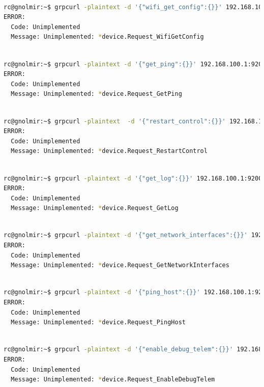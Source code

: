 \documentclass[IN,11pt,twoside,openright,bachelor,english]{tumthesis}
\begin{document}
\begin{lstlisting}[language=bash,basicstyle=\tiny]

rc@gnolmir:~$ grpcurl -plaintext -d '{"wifi_get_config":{}}' 192.168.100.1:9200 SpaceX.API.Device.Device/Handle
ERROR:
  Code: Unimplemented
  Message: Unimplemented: *device.Request_WifiGetConfig
\end{lstlisting}
\begin{lstlisting}[language=bash,basicstyle=\tiny]
 
rc@gnolmir:~$ grpcurl -plaintext -d '{"get_ping":{}}' 192.168.100.1:9200 SpaceX.API.Device.Device/Handle
ERROR:
  Code: Unimplemented
  Message: Unimplemented: *device.Request_GetPing
\end{lstlisting}
\begin{lstlisting}[language=bash,basicstyle=\tiny]

rc@gnolmir:~$ grpcurl -plaintext  -d '{"restart_control":{}}' 192.168.100.1:9200 SpaceX.API.Device.Device/Handle
ERROR:
  Code: Unimplemented
  Message: Unimplemented: *device.Request_RestartControl
\end{lstlisting}
\begin{lstlisting}[language=bash,basicstyle=\tiny]

rc@gnolmir:~$ grpcurl -plaintext -d '{"get_log":{}}' 192.168.100.1:9200 SpaceX.API.Device.Device/Handle
ERROR:
  Code: Unimplemented
  Message: Unimplemented: *device.Request_GetLog
\end{lstlisting}
\begin{lstlisting}[language=bash,basicstyle=\tiny]

rc@gnolmir:~$ grpcurl -plaintext -d '{"get_network_interfaces":{}}' 192.168.100.1:9200 SpaceX.API.Device.Device/Handle
ERROR:
  Code: Unimplemented
  Message: Unimplemented: *device.Request_GetNetworkInterfaces
\end{lstlisting}
\begin{lstlisting}[language=bash,basicstyle=\tiny]

rc@gnolmir:~$ grpcurl -plaintext -d '{"ping_host":{}}' 192.168.100.1:9200 SpaceX.API.Device.Device/Handle
ERROR:
  Code: Unimplemented
  Message: Unimplemented: *device.Request_PingHost
\end{lstlisting}
\begin{lstlisting}[language=bash,basicstyle=\tiny]

rc@gnolmir:~$ grpcurl -plaintext -d '{"enable_debug_telem":{}}' 192.168.100.1:9200 SpaceX.API.Device.Device/Handle
ERROR:
  Code: Unimplemented
  Message: Unimplemented: *device.Request_EnableDebugTelem
\end{lstlisting}
\end{document}
